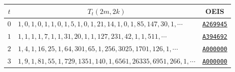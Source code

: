 \begin{table}[h]
  \centering
  \begin{tabular}{|c|l |c|}
    \hline
    \multicolumn{1}{|c|}{$t$} &
    \multicolumn{1}{c|}{$T_t(2m,2k)$} &
    \multicolumn{1}{c|}{OEIS} \\
    \hline

    $0$ &
    $1, 0, 1, 0, 1, 1, 0, 1, 5, 1, 0, 1, 21, 14, 1, 0, 1, 85, 147, 30, 1, \cdots $
    & \href{https://oeis.org/A269945}{\texttt{A269945}} \\

    $1$ &
    $1, 1, 1, 1, 7, 1, 1, 31, 20, 1, 1, 127, 231, 42, 1, 1, 511,\cdots$
    & \href{https://oeis.org/A394692}{\texttt{A394692}} \\

    $2$ &
    $1,4,1,16,25,1,64,301,65,1,256,3025,1701,126,1, \cdots$
    & \href{https://oeis.org/A000000}{\texttt{A000000}} \\

    $3$ &
    $1, 9, 1, 81, 55, 1, 729, 1351, 140, 1, 6561, 26335, 6951, 266, 1, \cdots$
    & \href{https://oeis.org/A000000}{\texttt{A000000}} \\

    \hline
  \end{tabular}
\end{table}
